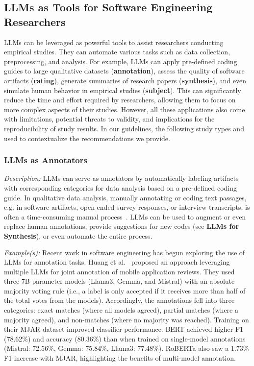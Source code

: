 \documentclass[11pt]{article}
\begin{document}
\subsection{LLMs as Tools for Software Engineering Researchers}

LLMs can be leveraged as powerful tools to assist researchers conducting empirical studies.
They can automate various tasks such as data collection, preprocessing, and analysis.
For example, LLMs can apply pre-defined coding guides to large qualitative datasets (\textbf{annotation}), assess the quality of software artifacts (\textbf{rating}), generate summaries of research papers (\textbf{synthesis}), and even simulate human behavior in empirical studies (\textbf{subject}).
This can significantly reduce the time and effort required by researchers, allowing them to focus on more complex aspects of their studies.
However, all these applications also come with limitations, potential threats to validity, and implications for the reproducibility of study results.
In our guidelines, the following study types and used to contextualize the recommendations we provide.


\subsubsection{LLMs as Annotators}

\emph{Description:} LLMs can serve as annotators by automatically labeling artifacts with corresponding categories for data analysis based on a pre-defined coding guide.
In qualitative data analysis, manually annotating or coding text passages, e.g. in software artifacts, open-ended survey responses, or interview transcripts, is often a time-consuming manual process~\cite{DBLP:journals/ase/BanoHZT24}.
LLMs can be used to augment or even replace human annotations, provide suggestions for new codes (see \textbf{LLMs for Synthesis}), or even automate the entire process.

\emph{Example(s):} Recent work in software engineering has begun exploring the use of LLMs for annotation tasks.
Huang et al.~\cite{Huang2023Enhancing} proposed an approach leveraging multiple LLMs for joint annotation of mobile application reviews. 
They used three 7B-parameter models (Llama3, Gemma, and Mistral) with an absolute majority voting rule (i.e., a label is only accepted if it receives more than half of the total votes from the models). 
Accordingly, the annotations fell into three categories: exact matches (where all models agreed), partial matches (where a majority agreed), and non-matches (where no majority was reached).
Training on their MJAR dataset improved classifier performance. BERT achieved higher F1 (78.62\%) and accuracy (80.36\%) than when trained on single-model annotations (Mistral: 72.56\%, Gemma: 75.84\%, Llama3: 77.48\%). RoBERTa also saw a 1.73\% F1 increase with MJAR, highlighting the benefits of multi-model annotation.
\end{document}

